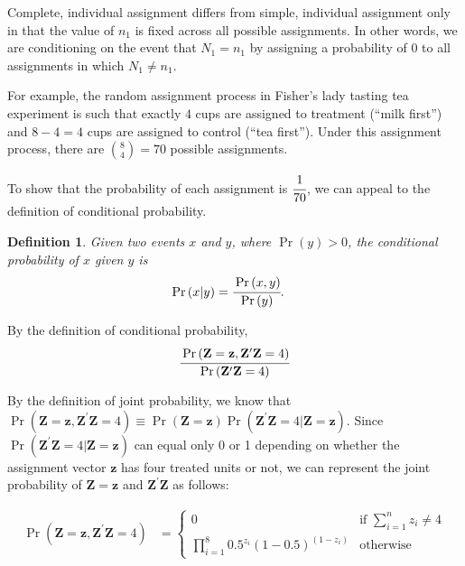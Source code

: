 \documentclass[12pt,leqno]{article}
\theoremstyle{newstyle}
\newtheorem{definition}{Definition}
\begin{document}
Complete, individual assignment differs from simple, individual
assignment only in that the value of \(n_1\) is fixed across all
possible assignments. In other words, we are conditioning on the event
that \(N_1 = n_1\) by assigning a probability of \(0\) to all
assignments in which \(N_1 \neq n_1\).

For example, the random assignment process in Fisher's lady tasting tea
experiment is such that exactly \(4\) cups are assigned to treatment
(\enquote{milk first}) and \(8 - 4 = 4\) cups are assigned to control
(\enquote{tea first}). Under this assignment process, there are
\(\binom{8}{4} = 70\) possible assignments.

To show that the probability of each assignment is \(\cfrac{1}{70}\), we
can appeal to the definition of conditional probability.

\begin{definition}
Given two events $x$ and $y$, where $\Pr\left(y\right) > 0$, the conditional probability of $x$ given $y$ is
\begin{align*}
\Pr\left(x \vert y \right) & = \cfrac{\Pr\left(x, y\right)}{\Pr\left(y\right)}.
\end{align*}
\end{definition}

By the definition of conditional probability, \begin{align*}
\cfrac{\Pr\left(\mathbf{Z} = \mathbf{z}, \mathbf{Z}^{\prime}\mathbf{Z} = 4\right)}{\Pr\left(\mathbf{Z}^{\prime}\mathbf{Z} = 4\right)}
\end{align*}

By the definition of joint probability, we know that
\(\Pr\left(\mathbf{Z} = \mathbf{z}, \mathbf{Z}^{\prime}\mathbf{Z} = 4\right) \equiv \Pr\left(\mathbf{Z} = \mathbf{z}\right)\Pr\left(\mathbf{Z}^{\prime}\mathbf{Z} = 4 \vert \mathbf{Z} = \mathbf{z}\right)\).
Since
\(\Pr\left(\mathbf{Z}^{\prime}\mathbf{Z} = 4 \vert \mathbf{Z} = \mathbf{z}\right)\)
can equal only 0 or 1 depending on whether the assignment vector
\(\mathbf{z}\) has four treated units or not, we can represent the joint
probability of \(\mathbf{Z} = \mathbf{z}\) and
\(\mathbf{Z}^{\prime}\mathbf{Z}\) as follows:

\begin{align*}
\Pr\left(\mathbf{Z} = \mathbf{z}, \mathbf{Z}^{\prime}\mathbf{Z} = 4\right) & = \begin{cases}
0 & \text{if } \sum \limits_{i = 1}^n z_i \neq 4 \\
\prod_{i = 1}^8 0.5^{z_i}\left(1 - 0.5\right)^{(1 - z_i)} & \text{otherwise} 
\end{cases}
\end{align*}
\end{document}
